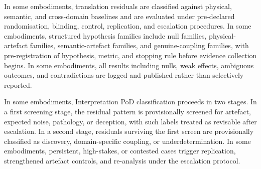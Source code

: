 \documentclass[a4paper,12pt]{article}
\begin{document}
In some embodiments, translation residuals are classified against
physical, semantic, and cross-domain baselines and are evaluated under
pre-declared randomisation, blinding, control, replication, and
escalation procedures. In some embodiments, structured hypothesis
families include null families, physical-artefact families,
semantic-artefact families, and genuine-coupling families, with
pre-registration of hypothesis, metric, and stopping rule before
evidence collection begins. In some embodiments, all results including
nulls, weak effects, ambiguous outcomes, and contradictions are logged
and published rather than selectively reported.

In some embodiments, Interpretation PoD classification proceeds in two
stages. In a first screening stage, the residual pattern is
provisionally screened for artefact, expected noise, pathology, or
deception, with such labels treated as revisable after escalation. In
a second stage, residuals surviving the first screen are provisionally
classified as discovery, domain-specific coupling, or
underdetermination. In some embodiments, persistent, high-stakes, or
contested cases trigger replication, strengthened artefact controls,
and re-analysis under the escalation protocol.
\end{document}
